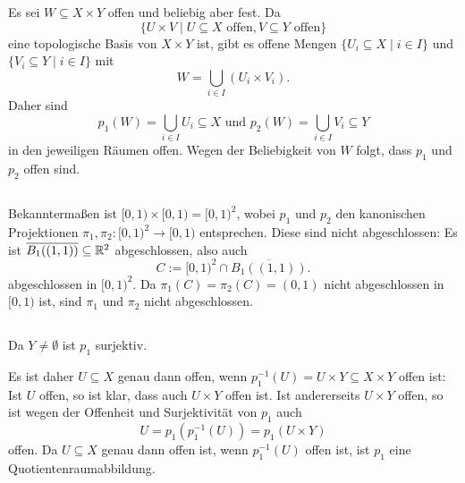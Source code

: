 \documentclass[a4paper,10pt]{article}
\begin{document}
\section{}


\subsection{}
Es sei $W \subseteq X \times Y$ offen und beliebig aber fest. Da
\[
 \{U \times V \mid U \subseteq X \text{ offen}, V \subseteq Y \text{ offen}\}
\]
eine topologische Basis von $X \times Y$ ist, gibt es offene Mengen  $\{U_i \subseteq X \mid i \in I\}$ und $\{V_i \subseteq Y \mid i \in I\}$ mit
\[
 W = \bigcup_{i \in I} (U_i \times V_i).
\]
Daher sind
\[
 p_1(W) = \bigcup_{i \in I} U_i \subseteq X \text{ und } p_2(W) = \bigcup_{i \in I} V_i \subseteq Y
\]
in den jeweiligen Räumen offen. Wegen der Beliebigkeit von $W$ folgt, dass $p_1$ und $p_2$ offen sind.


\subsection{}
Bekanntermaßen ist $[0,1) \times [0,1) = [0,1)^2$, wobei $p_1$ und $p_2$ den kanonischen Projektionen $\pi_1, \pi_2 : [0,1)^2 \to [0,1)$ entsprechen. Diese sind nicht abgeschlossen: Es ist $\overline{B_1((1,1))} \subseteq \mathbb{R}^2$ abgeschlossen, also auch
\[
 C := [0,1)^2 \cap \overline{B_1((1,1))}.
\]
abgeschlossen in $[0,1)^2$. Da $\pi_1(C) = \pi_2(C) = (0,1)$ nicht abgeschlossen in $[0,1)$ ist, sind $\pi_1$ und $\pi_2$ nicht abgeschlossen.


\subsection{}
Da $Y \neq \emptyset$ ist $p_1$ surjektiv.

Es ist daher $U \subseteq X$ genau dann offen, wenn $p_1^{-1}(U) = U \times Y \subseteq X \times Y$ offen ist: Ist $U$ offen, so ist klar, dass auch $U \times Y$ offen ist. Ist andererseits $U \times Y$ offen, so ist wegen der Offenheit und Surjektivität von $p_1$ auch
\[
 U = p_1(p_1^{-1}(U)) = p_1(U \times Y)
\]
offen.
Da $U \subseteq X$ genau dann offen ist, wenn $p_1^{-1}(U)$ offen ist, ist $p_1$ eine Quotientenraumabbildung.





\section{}
\end{document}
